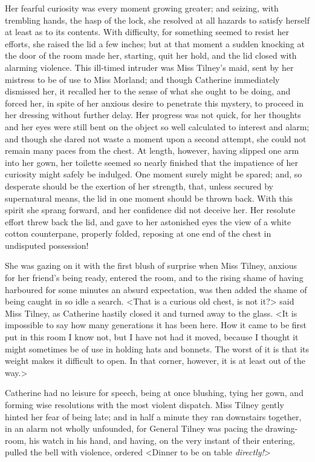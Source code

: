  Her fearful curiosity was every moment growing greater; and seizing, with trembling hands, the hasp of the lock, she resolved at all hazards to satisfy herself at least as to its contents. With difficulty, for something seemed to resist her efforts, she raised the lid a few inches; but at that moment a sudden knocking at the door of the room made her, starting, quit her hold, and the lid closed with alarming violence. This ill-timed intruder was Miss Tilney's maid, sent by her mistress to be of use to Miss Morland; and though Catherine immediately dismissed her, it recalled her to the sense of what she ought to be doing, and forced her, in spite of her anxious desire to penetrate this mystery, to proceed in her dressing without further delay. Her progress was not quick, for her thoughts and her eyes were still bent on the object so well calculated to interest and alarm; and though she dared not waste a moment upon a second attempt, she could not remain many paces from the chest. At length, however, having slipped one arm into her gown, her toilette seemed so nearly finished that the impatience of her curiosity might safely be indulged. One moment surely might be spared; and, so desperate should be the exertion of her strength, that, unless secured by supernatural means, the lid in one moment should be thrown back. With this spirit she sprang forward, and her confidence did not deceive her. Her resolute effort threw back the lid, and gave to her astonished eyes the view of a white cotton counterpane, properly folded, reposing at one end of the chest in undisputed possession! 

 She was gazing on it with the first blush of surprise when Miss Tilney, anxious for her friend's being ready, entered the room, and to the rising shame of having harboured for some minutes an absurd expectation, was then added the shame of being caught in so idle a search. <That is a curious old chest, is not it?> said Miss Tilney, as Catherine hastily closed it and turned away to the glass. <It is impossible to say how many generations it has been here. How it came to be first put in this room I know not, but I have not had it moved, because I thought it might sometimes be of use in holding hats and bonnets. The worst of it is that its weight makes it difficult to open. In that corner, however, it is at least out of the way.> 

 Catherine had no leisure for speech, being at once blushing, tying her gown, and forming wise resolutions with the most violent dispatch. Miss Tilney gently hinted her fear of being late; and in half a minute they ran downstairs together, in an alarm not wholly unfounded, for General Tilney was pacing the drawing-room, his watch in his hand, and having, on the very instant of their entering, pulled the bell with violence, ordered <Dinner to be on table \textit{directly!}> 

